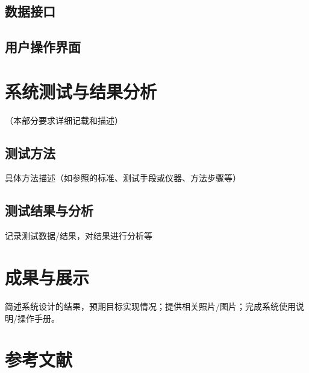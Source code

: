 		\subsection{数据接口} %
		\label{sub:数据接口}
		
		\newpage

		\subsection{用户操作界面} %
		\label{sub:用户操作界面}
		
	\newpage

	\section{系统测试与结果分析} %
	\label{sec:系统测试与结果分析}

		（本部分要求详细记载和描述）

		\subsection{测试方法} %
		\label{sub:测试方法}
			具体方法描述（如参照的标准、测试手段或仪器、方法步骤等）
		\newpage

		\subsection{测试结果与分析} %
		\label{sub:测试结果与分析}
			记录测试数据/结果，对结果进行分析等
	\newpage

	\section{成果与展示} %
	\label{sec:成果与展示}
		简述系统设计的结果，预期目标实现情况；提供相关照片/图片；完成系统使用说明/操作手册。

	\section{参考文献} %
	\label{sec:参考文献}
		\begingroup
		    \setlength{\bibsep}{0pt}
		\endgroup
	\newpage

